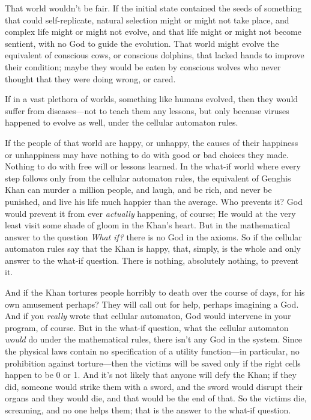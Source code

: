 {
 That world wouldn't be fair. If the initial state
contained the seeds of something that could self-replicate, natural
selection might or might not take place, and complex life might or
might not evolve, and that life might or might not become sentient,
with no God to guide the evolution. That world might evolve the
equivalent of conscious cows, or conscious dolphins, that lacked hands
to improve their condition; maybe they would be eaten by conscious
wolves who never thought that they were doing wrong, or cared.}

{
 If in a vast plethora of worlds, something like humans evolved,
then they would suffer from diseases---not to teach them any lessons,
but only because viruses happened to evolve as well, under the cellular
automaton rules.}

{
 If the people of that world are happy, or unhappy, the causes of
their happiness or unhappiness may have nothing to do with good or bad
choices they made. Nothing to do with free will or lessons learned. In
the what-if world where every step follows only from the cellular
automaton rules, the equivalent of Genghis Khan can murder a million
people, and laugh, and be rich, and never be punished, and live his
life much happier than the average. Who prevents it? God would prevent
it from ever \textit{actually} happening, of course; He would at the
very least visit some shade of gloom in the Khan's
heart. But in the mathematical answer to the question \textit{What if?}
there is no God in the axioms. So if the cellular automaton rules say
that the Khan is happy, that, simply, is the whole and only answer to
the what-if question. There is nothing, absolutely nothing, to prevent
it.}

{
 And if the Khan tortures people horribly to death over the course
of days, for his own amusement perhaps? They will call out for help,
perhaps imagining a God. And if you \textit{really} wrote that cellular
automaton, God would intervene in your program, of course. But in the
what-if question, what the cellular automaton \textit{would} do under
the mathematical rules, there isn't any God in the
system. Since the physical laws contain no specification of a utility
function---in particular, no prohibition against torture---then the
victims will be saved only if the right cells happen to be 0 or 1. And
it's not likely that anyone will defy the Khan; if they
did, someone would strike them with a sword, and the sword would
disrupt their organs and they would die, and that would be the end of
that. So the victims die, screaming, and no one helps them; that is the
answer to the what-if question.}

